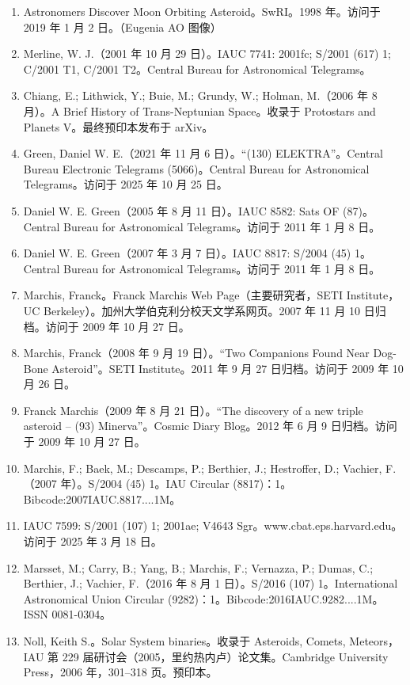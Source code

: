 \begin{enumerate}
\item Astronomers Discover Moon Orbiting Asteroid。SwRI。1998 年。访问于 2019 年 1 月 2 日。（Eugenia AO 图像）
\item Merline, W. J.（2001 年 10 月 29 日）。IAUC 7741: 2001fc; S/2001 (617) 1; C/2001 T1, C/2001 T2。Central Bureau for Astronomical Telegrams。
\item Chiang, E.; Lithwick, Y.; Buie, M.; Grundy, W.; Holman, M.（2006 年 8 月）。A Brief History of Trans-Neptunian Space。收录于 Protostars and Planets V。最终预印本发布于 arXiv。
\item Green, Daniel W. E.（2021 年 11 月 6 日）。“(130) ELEKTRA”。Central Bureau Electronic Telegrams (5066)。Central Bureau for Astronomical Telegrams。访问于 2025 年 10 月 25 日。
\item Daniel W. E. Green（2005 年 8 月 11 日）。IAUC 8582: Sats OF (87)。Central Bureau for Astronomical Telegrams。访问于 2011 年 1 月 8 日。
\item Daniel W. E. Green（2007 年 3 月 7 日）。IAUC 8817: S/2004 (45) 1。Central Bureau for Astronomical Telegrams。访问于 2011 年 1 月 8 日。
\item Marchis, Franck。Franck Marchis Web Page（主要研究者，SETI Institute，UC Berkeley）。加州大学伯克利分校天文学系网页。2007 年 11 月 10 日归档。访问于 2009 年 10 月 27 日。
\item Marchis, Franck（2008 年 9 月 19 日）。“Two Companions Found Near Dog-Bone Asteroid”。SETI Institute。2011 年 9 月 27 日归档。访问于 2009 年 10 月 26 日。
\item Franck Marchis（2009 年 8 月 21 日）。“The discovery of a new triple asteroid – (93) Minerva”。Cosmic Diary Blog。2012 年 6 月 9 日归档。访问于 2009 年 10 月 27 日。
\item Marchis, F.; Baek, M.; Descamps, P.; Berthier, J.; Hestroffer, D.; Vachier, F.（2007 年）。S/2004 (45) 1。IAU Circular (8817)：1。Bibcode:2007IAUC.8817....1M。
\item IAUC 7599: S/2001 (107) 1; 2001ae; V4643 Sgr。www.cbat.eps.harvard.edu。访问于 2025 年 3 月 18 日。
\item Marsset, M.; Carry, B.; Yang, B.; Marchis, F.; Vernazza, P.; Dumas, C.; Berthier, J.; Vachier, F.（2016 年 8 月 1 日）。S/2016 (107) 1。International Astronomical Union Circular (9282)：1。Bibcode:2016IAUC.9282....1M。ISSN 0081-0304。
\item Noll, Keith S.。Solar System binaries。收录于 Asteroids, Comets, Meteors，IAU 第 229 届研讨会（2005，里约热内卢）论文集。Cambridge University Press，2006 年，301–318 页。预印本。

\end{enumerate}
